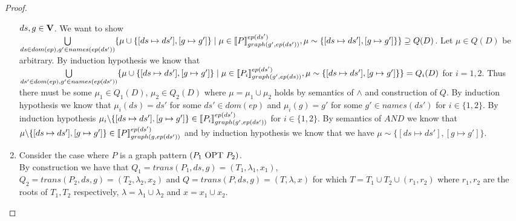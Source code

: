 \begin{proof}
\begin{enumerate}
			\bigskip\noindent
			$ds,g \in \mathbf{V}$.
			We want to show 
			$\bigcup\limits_{ds \in dom(ep),g' \in names(ep(ds'))} \{ \mu \cup \{[ds \mapsto ds'],[g
				\mapsto g']\} \mid \mu \in
				\llbracket P \rrbracket^{ep(ds')}_{graph(g', ep(ds'))}, \mu \sim
			\{[ds \mapsto ds'], [g \mapsto g']\} \}  \supseteq Q(D) $.
			Let $\mu \in Q(D)$ be arbitrary.
			By induction hypothesis we know that  
			$\bigcup\limits_{ds' \in dom(ep), g' \in names(ep(ds'))} 
			\{ \mu \cup \{[ds \mapsto ds'], [g	\mapsto g']\} \mid\\
				\mu \in	\llbracket P_i\rrbracket^{ep(ds')}_{graph(g', ep(ds))}, \mu \sim
			\{[ds\mapsto ds'],[g \mapsto g']\} \}  = Q_i(D) $ for $i=1,2$.
			Thus there must be some $\mu_1 \in Q_1(D)$, $\mu_2 \in Q_2(D)$ 
			where $\mu= \mu_1 \cup \mu_2$ holds by semantics of $\land$ and construction of $Q$.
			By induction hypothesis we know that $\mu_i(ds) = ds'$ for some
			$ds' \in dom(ep)$ and $\mu_i(g) = g'$ for some $g' \in names(ds')$ for $i \in \{1,2\}$.
			By induction hypothesis $\mu_i\backslash\{[ds\mapsto ds'], [g \mapsto g'] \} \in \llbracket P_i
			\rrbracket^{ep(ds')}_{graph(g',ep(ds'))}$ for $i \in \{ 1,2 \}$.
			By semantics of $AND$  we know that $\mu \backslash \{[ds\mapsto ds'], [g
			\mapsto g'] \} \in \llbracket P
			\rrbracket^{ep(ds')}_{graph(g,ep(ds'))}$ and by induction hypothesis we know that we have 
			$\mu \sim \{[ds\mapsto ds'], [g \mapsto g'] \}$.



		\item Consider the case where $P$ is a graph pattern $(P_1 \mbox{ OPT }	P_2)$. \\
			By construction we have that $ Q_1 = trans(P_1,ds,g) =
			(T_1,\lambda_1,x_1)$,\\ $Q_2 = trans(P_2,ds,g) = (T_2,\lambda_2,x_2)$ 
			and $Q = trans(P,ds,g) = (T,\lambda,x)$ for which $T = T_1 \cup T_2
			\cup (r_1,r_2)$ where $r_1,r_2$ are the roots of $T_1,T_2$
			respectively, $\lambda = \lambda_1 \cup \lambda_2$ and $x = x_1 \cup
			x_2$.


\end{enumerate}
\end{proof}

